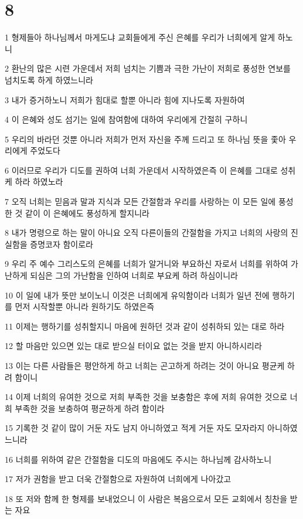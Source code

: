 \chapter{8}

\par 1 형제들아 하나님께서 마게도냐 교회들에게 주신 은혜를 우리가 너희에게 알게 하노니
\par 2 환난의 많은 시련 가운데서 저희 넘치는 기쁨과 극한 가난이 저희로 풍성한 연보를 넘치도록 하게 하였느니라
\par 3 내가 증거하노니 저희가 힘대로 할뿐 아니라 힘에 지나도록 자원하여
\par 4 이 은혜와 성도 섬기는 일에 참여함에 대하여 우리에게 간절히 구하니
\par 5 우리의 바라던 것뿐 아니라 저희가 먼저 자신을 주께 드리고 또 하나님 뜻을 좇아 우리에게 주었도다
\par 6 이러므로 우리가 디도를 권하여 너희 가운데서 시작하였은즉 이 은혜를 그대로 성취케 하라 하였노라
\par 7 오직 너희는 믿음과 말과 지식과 모든 간절함과 우리를 사랑하는 이 모든 일에 풍성한 것 같이 이 은혜에도 풍성하게 할지니라
\par 8 내가 명령으로 하는 말이 아니요 오직 다른이들의 간절함을 가지고 너희의 사랑의 진실함을 증명코자 함이로라
\par 9 우리 주 예수 그리스도의 은혜를 너희가 알거니와 부요하신 자로서 너희를 위하여 가난하게 되심은 그의 가난함을 인하여 너희로 부요케 하려 하심이니라
\par 10 이 일에 내가 뜻만 보이노니 이것은 너희에게 유익함이라 너희가 일년 전에 행하기를 먼저 시작할뿐 아니라 원하기도 하였은즉
\par 11 이제는 행하기를 성취할지니 마음에 원하던 것과 같이 성취하되 있는 대로 하라
\par 12 할 마음만 있으면 있는 대로 받으실 터이요 없는 것을 받지 아니하시리라
\par 13 이는 다른 사람들은 평안하게 하고 너희는 곤고하게 하려는 것이 아니요 평균케 하려 함이니
\par 14 이제 너희의 유여한 것으로 저희 부족한 것을 보충함은 후에 저희 유여한 것으로 너희 부족한 것을 보충하여 평균하게 하려 함이라
\par 15 기록한 것 같이 많이 거둔 자도 남지 아니하였고 적게 거둔 자도 모자라지 아니하였느니라
\par 16 너희를 위하여 같은 간절함을 디도의 마음에도 주시는 하나님께 감사하노니
\par 17 저가 권함을 받고 더욱 간절함으로 자원하여 너희에게 나아갔고
\par 18 또 저와 함께 한 형제를 보내었으니 이 사람은 복음으로서 모든 교회에서 칭찬을 받는 자요
